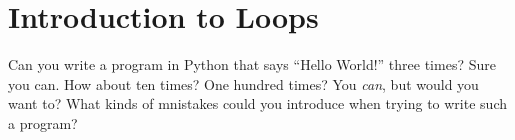 
\chapter{Introduction to Loops}


\minitoc

Can you write a program in Python that says ``Hello World!'' three times?  Sure you can.  How about ten times?  One hundred times?  You \textit{can}, but would you want to?  What kinds of mnistakes could you introduce when trying to write such a program?

